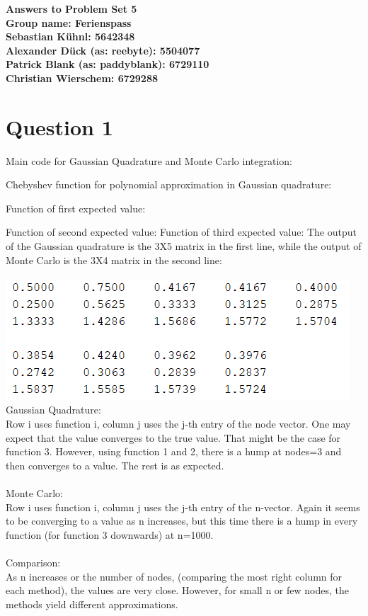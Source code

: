 \documentclass{article}
\begin{document}
	\begin{center}
		\LARGE \bfseries{Answers to Problem Set 5}\\
		Group name: Ferienspass\vspace{.5cm}\\
		\normalsize \normalfont
		Sebastian K\"uhnl: 5642348\\
		Alexander D\"uck (as: reebyte): 5504077\\
		Patrick Blank (as: paddyblank): 6729110\\
		Christian Wierschem: 6729288
	\end{center}
	\normalsize	
	\section{Question 1}
		Main code for Gaussian Quadrature and Monte Carlo integration:

Chebyshev function for polynomial approximation in Gaussian quadrature:

Function of first expected value:

Function of second expected value:
Function of third expected value:
The output of the Gaussian quadrature is the 3X5 matrix in the first line, while the output of Monte Carlo is the 3X4 matrix in the second line:\\\\
	\includegraphics[width = \textwidth, keepaspectratio]{output.png}
	Gaussian Quadrature:\\
	Row i uses function i, column j uses the j-th entry of the node vector. One may expect that the value converges to the true value. That might be the case for function 3. However, using function 1 and 2, there is a hump at nodes=3 and then converges to a value. The rest is as expected.\\\\
	Monte Carlo:\\
	Row i uses function i, column j uses the j-th entry of the n-vector. Again it seems to be converging to a value as n increases, but this time there is a hump in every function (for function 3 downwards) at n=1000.\\\\
	Comparison:\\
	As n increases or the number of nodes, (comparing the most right column for each method), the values are very close. However, for small n or few nodes, the methods yield different approximations.
\end{document}
